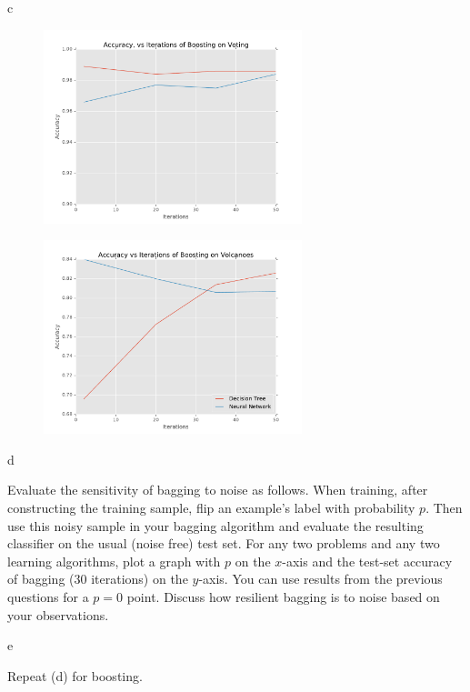 \documentclass[fleqn]{homework}
\begin{document}
\begin{problem}{c}
    \begin{figure}[h!]
      \centering
      \caption{}
      \label{f:c-voting}
      \includegraphics[width=0.67\textwidth]{c-voting.pdf}
    \end{figure}
    \begin{figure}[h!]
      \centering
      \caption{}
      \label{f:c-volcanoes}
      \includegraphics[width=0.67\textwidth]{c-volcanoes.pdf}
    \end{figure}

  \end{problem}

  \begin{problem}{d}
    \begin{question}
      Evaluate the sensitivity of bagging to noise as follows. When training,
      after constructing the training sample, flip an example’s label with
      probability $p$. Then use this noisy sample in your bagging algorithm and
      evaluate the resulting classifier on the usual (noise free) test set. For
      any two problems and any two learning algorithms, plot a graph with $p$ on
      the $x$-axis and the test-set accuracy of bagging (30 iterations) on the
      $y$-axis. You can use results from the previous questions for a $p=0$
      point. Discuss how resilient bagging is to noise based on your
      observations.
    \end{question}
  \end{problem}

  \begin{problem}{e}
    \begin{question}
      Repeat (d) for boosting.
    \end{question}
  \end{problem}
\end{document}
